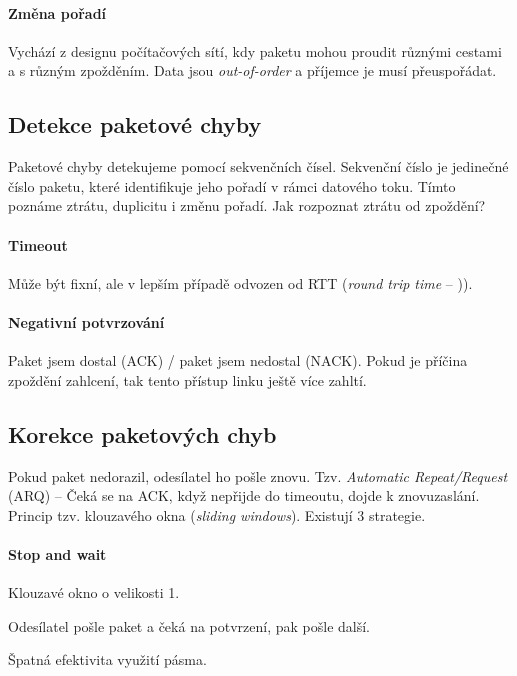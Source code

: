 \paragraph*{Změna pořadí} Vychází z designu počítačových sítí, kdy paketu mohou proudit různými cestami a s různým zpožděním. Data jsou \textit{out-of-order} a příjemce je musí přeuspořádat.

\subsection{Detekce paketové chyby}

Paketové chyby detekujeme pomocí sekvenčních čísel. Sekvenční číslo je jedinečné číslo paketu, které identifikuje jeho pořadí v rámci datového toku. Tímto poznáme ztrátu, duplicitu i změnu pořadí. Jak rozpoznat ztrátu od zpoždění?

\paragraph*{Timeout} Může být fixní, ale v lepším případě odvozen od RTT (\textit{round trip time} -- )).

\paragraph*{Negativní potvrzování} Paket jsem dostal (ACK) / paket jsem nedostal (NACK). Pokud je příčina zpoždění zahlcení, tak tento přístup linku ještě více zahltí.

\subsection{Korekce paketových chyb}

Pokud paket nedorazil, odesílatel ho pošle znovu. Tzv. \textit{Automatic Repeat/Request} (ARQ) -- Čeká se na ACK, když nepřijde do timeoutu, dojde k znovuzaslání. Princip tzv. klouzavého okna (\textit{sliding windows}). Existují 3 strategie.

\paragraph*{Stop and wait} \begin{compactitem}
    \item Klouzavé okno o velikosti 1.
    \item Odesílatel pošle paket a čeká na potvrzení, pak pošle další.
    \item Špatná efektivita využití pásma.
\end{compactitem}

